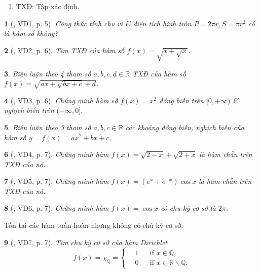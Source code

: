 \documentclass{article}
\newtheorem{baitoan}{}
\begin{document}
\begin{enumerate}
	\item TXĐ: Tập xác định.
\end{enumerate}

\begin{baitoan}[\cite{Hai_Hung_Thu_Tung_ncpt_Toan_10_tap_2}, VD1, p. 5]
	Công thức tính chu vi \& diện tích hình tròn $P = 2\pi r,S = \pi r^2$ có là hàm số không?
\end{baitoan}

\begin{baitoan}[\cite{Hai_Hung_Thu_Tung_ncpt_Toan_10_tap_2}, VD2, p. 6]
	Tìm {\rm TXĐ} của hàm số $f(x) = \sqrt{x + \sqrt{x}}$.
\end{baitoan}

\begin{baitoan}
	Biện luận theo 4 tham số $a,b,c,d\in\mathbb{R}$ {\rm TXĐ} của hàm số $f(x) = \sqrt{ax + \sqrt{bx + c} + d}$.
\end{baitoan}

\begin{baitoan}[\cite{Hai_Hung_Thu_Tung_ncpt_Toan_10_tap_2}, VD3, p. 6]
	Chứng minh hàm số $f(x) = x^2$ đồng biến trên $[0,+\infty)$ \& nghịch biến trên $(-\infty,0]$.
\end{baitoan}

\begin{baitoan}
	Biện luận theo 3 tham số $a,b,c\in\mathbb{R}$ các khoảng đồng biến, nghịch biến của hàm số $y = f(x) = ax^2 + bx + c$.
\end{baitoan}

\begin{baitoan}[\cite{Hai_Hung_Thu_Tung_ncpt_Toan_10_tap_2}, VD4, p. 7]
	Chứng minh hàm $f(x) = \sqrt{2 - x} + \sqrt{2 + x}$ là hàm chẵn trên {\rm TXĐ} của nó.
\end{baitoan}

\begin{baitoan}[\cite{Hai_Hung_Thu_Tung_ncpt_Toan_10_tap_2}, VD5, p. 7]
	Chứng minh hàm $f(x) = (e^x + e^{-x})\cos x$ là hàm chẵn trên {\rm TXĐ} của nó.
\end{baitoan}

\begin{baitoan}[\cite{Hai_Hung_Thu_Tung_ncpt_Toan_10_tap_2}, VD6, p. 7]
	Chứng minh hàm $f(x) = \cos x$ có chu kỳ cơ sở là $2\pi$.
\end{baitoan}
Tồn tại các hàm tuần hoàn nhưng không có chù kỳ cơ sở.

\begin{baitoan}[\cite{Hai_Hung_Thu_Tung_ncpt_Toan_10_tap_2}, VD7, p. 7]
	Tìm chu kỳ cơ sở của hàm Dirichlet
	\begin{equation}
		f(x) = \chi_\mathbb{Q} = \left\{\begin{split}
			&1&&\mbox{if } x\in\mathbb{Q},\\
			&0&&\mbox{if } x\in\mathbb{R}\backslash\mathbb{Q}.
		\end{split}\right.
	\end{equation}
\end{baitoan}
\end{document}
